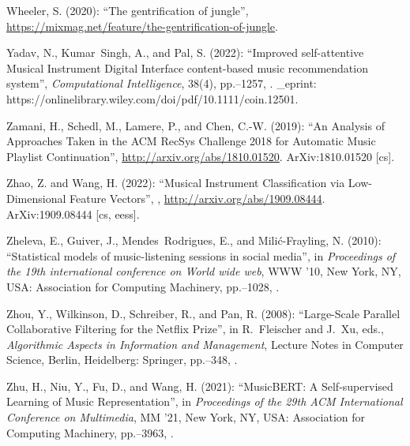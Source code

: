 \documentclass[11pt,titlepage,oneside]{book}
\begin{document}
\begin{thebibliography}{97}
	Wheeler, S. (2020): \enquote{The gentrification of jungle},
	\urlprefix\url{https://mixmag.net/feature/the-gentrification-of-jungle}.
	
	Yadav, N., Kumar~Singh, A., and Pal, S. (2022): \enquote{Improved
		self-attentive {Musical} {Instrument} {Digital} {Interface} content-based
		music recommendation system}, \textit{Computational Intelligence}, 38(4),
	pp.--1257, . \_eprint:
	https://onlinelibrary.wiley.com/doi/pdf/10.1111/coin.12501.
	
	Zamani, H., Schedl, M., Lamere, P., and Chen, C.-W. (2019): \enquote{An
		{Analysis} of {Approaches} {Taken} in the {ACM} {RecSys} {Challenge} 2018 for
		{Automatic} {Music} {Playlist} {Continuation}},
	\urlprefix\url{http://arxiv.org/abs/1810.01520}. ArXiv:1810.01520 [cs].
	
	Zhao, Z. and Wang, H. (2022): \enquote{Musical {Instrument} {Classification}
		via {Low}-{Dimensional} {Feature} {Vectors}},
	,
	\urlprefix\url{http://arxiv.org/abs/1909.08444}. ArXiv:1909.08444 [cs, eess].
	
	Zheleva, E., Guiver, J., Mendes~Rodrigues, E., and Milić-Frayling, N. (2010):
	\enquote{Statistical models of music-listening sessions in social media}, in
	\textit{Proceedings of the 19th international conference on {World} wide
		web}, {WWW} '10, New York, NY, USA: Association for Computing Machinery,
	pp.--1028, .
	
	Zhou, Y., Wilkinson, D., Schreiber, R., and Pan, R. (2008):
	\enquote{Large-{Scale} {Parallel} {Collaborative} {Filtering} for the
		{Netflix} {Prize}}, in R.~Fleischer and J.~Xu, eds., \textit{Algorithmic
		{Aspects} in {Information} and {Management}}, Lecture {Notes} in {Computer}
	{Science}, Berlin, Heidelberg: Springer, pp.--348,
	.
	
	Zhu, H., Niu, Y., Fu, D., and Wang, H. (2021): \enquote{{MusicBERT}: {A}
		{Self}-supervised {Learning} of {Music} {Representation}}, in
	\textit{Proceedings of the 29th {ACM} {International} {Conference} on
		{Multimedia}}, {MM} '21, New York, NY, USA: Association for Computing
	Machinery, pp.--3963, .
	
\end{thebibliography}
\end{document}
